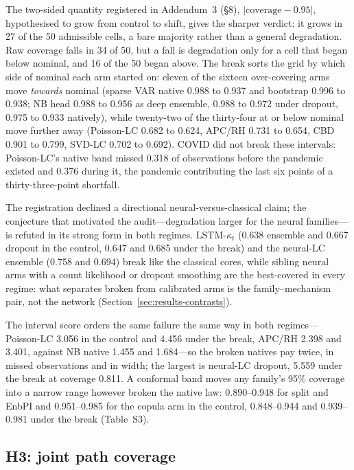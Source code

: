 The two-sided quantity registered in Addendum~3 (\S8), $|\text{coverage}-0.95|$,
hypothesised to grow from control to shift, gives the sharper verdict: it grows
in 27 of the 50 admissible cells, a bare majority rather than a general
degradation. Raw coverage falls in 34 of 50, but a fall is degradation only for
a cell that began below nominal, and 16 of the 50 began above. The break sorts
the grid by which side of nominal each arm started on: eleven of the sixteen
over-covering arms move \emph{towards} nominal (sparse VAR native 0.988 to 0.937
and bootstrap 0.996 to 0.938; NB head 0.988 to 0.956 as deep ensemble, 0.988 to
0.972 under dropout, 0.975 to 0.933 natively), while twenty-two of the
thirty-four at or below nominal move further away (Poisson-LC 0.682 to 0.624,
APC/RH 0.731 to 0.654, CBD 0.901 to 0.799, SVD-LC 0.702 to 0.692). COVID did not
break these intervals: Poisson-LC's native band missed 0.318 of observations
before the pandemic existed and 0.376 during it, the pandemic contributing the
last six points of a thirty-three-point shortfall.

The registration declined a directional neural-versus-classical claim; the
conjecture that motivated the audit---degradation larger for the neural
families---is refuted in its strong form in both regimes. LSTM-$\kappa_t$ (0.638
ensemble and 0.667 dropout in the control, 0.647 and 0.685 under the break) and
the neural-LC ensemble (0.758 and 0.694) break like the classical cores, while
sibling neural arms with a count likelihood or dropout smoothing are the
best-covered in every regime: what separates broken from calibrated arms is the
family--mechanism pair, not the network
(Section~\ref{sec:results-contrasts}).

The interval score orders the same failure the same way in both
regimes---Poisson-LC 3.056 in the control and 4.456 under the break, APC/RH
2.398 and 3.401, against NB native 1.455 and 1.684---so the broken natives pay
twice, in missed observations and in width; the largest is neural-LC dropout,
5.559 under the break at coverage 0.811. A conformal band moves any family's
95\% coverage into a narrow range however broken the native law: 0.890--0.948
for split and EnbPI and 0.951--0.985 for the copula arm in the control,
0.848--0.944 and 0.939--0.981 under the break (Table~S3).

\subsection{H3: joint path coverage}
\label{sec:results-joint}

